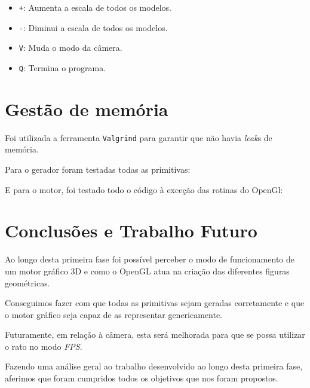 \documentclass[a4paper]{article}
\begin{document}
\begin{itemize}
    \item \texttt{+}: Aumenta a escala de todos os modelos.
    \item \texttt{-}: Diminui a escala de todos os modelos.
    \item \texttt{V}: Muda o modo da câmera.
    \item \texttt{Q}: Termina o programa.
\end{itemize}

\section{Gestão de memória}

Foi utilizada a ferramenta \texttt{Valgrind} para garantir que não havia \textit{leak}s de memória.

Para o gerador foram testadas todas as primitivas:



E para o motor, foi testado todo o código à exceção das rotinas do OpenGl:



\section{Conclusões e Trabalho Futuro}

Ao longo desta primeira fase foi possível perceber o modo de funcionamento de um motor gráfico 3D e como o OpenGL atua na criação das diferentes figuras geométricas.

Conseguimos fazer com que todas as primitivas sejam geradas corretamente e que o motor gráfico seja capaz de as representar genericamente.

Futuramente, em relação à câmera, esta será melhorada para que se possa utilizar o rato no modo \textit{FPS}.

Fazendo uma análise geral ao trabalho desenvolvido ao longo desta primeira fase, aferimos que foram cumpridos todos os objetivos que nos foram propostos.
\end{document}
